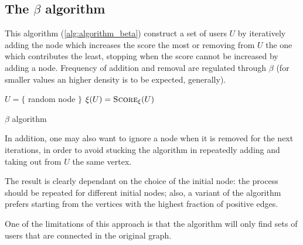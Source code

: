 \subsection{The $\beta$ algorithm}%
\label{ssub:the_beta_approach}

This algorithm (\autoref{alg:algorithm_beta}) construct a set of users $U$ by
iteratively adding the node which increases the score the most or removing from
$U$ the one which contributes the least, stopping when the score cannot be
increased by adding a node. Frequency of addition and removal are regulated
through $\beta $ (for smaller values an higher density is to be expected,
generally).

\begin{algorithm}
	\SetAlgoLined
	$U = \{$ random node $\}$\;
	$\xi(U) = \textsc{Score}_{\xi}(U)$ \;
	\caption{$\beta$ algorithm}
	\label{alg:algorithm_beta}
\end{algorithm}

In addition, one may also want to ignore a node when it is removed for the
next iterations, in order to avoid stucking the algorithm in repeatedly adding
and taking out from $U$ the same vertex.

The result is clearly dependant on the choice of the initial node: the process
should be repeated for different initial nodes; also, a variant
of the algorithm prefers starting from the vertices with the highest fraction of positive edges.

One of the limitations of this approach is that the algorithm will only find
sets of users that are connected in the original graph.

